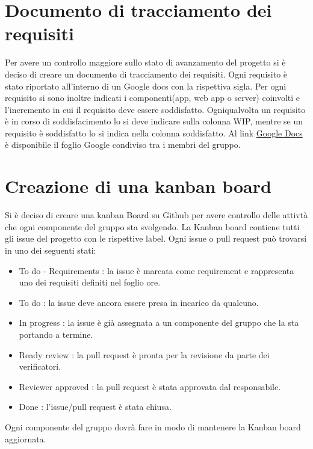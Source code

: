 \documentclass{article}
\begin{document}
\section{Documento di tracciamento dei requisiti}%
\label{sec:documento_di_tracciamento_dei_requisiti}

Per avere un controllo maggiore sullo stato di avanzamento del progetto si è deciso di creare un documento di tracciamento dei requisiti.
Ogni requisito è stato riportato all'interno di un Google docs con la rispettiva sigla. Per ogni requisito si sono inoltre indicati i componenti(app, web app o server)
coinvolti e l'incremento in cui il requisito deve essere soddisfatto.
Ogniqualvolta un requisito è in corso di soddisfacimento lo si deve indicare sulla colonna WIP, mentre se un requisito è soddisfatto lo si indica nella colonna soddisfatto.
Al link \href{https://docs.google.com/spreadsheets/d/1J-RbNrb1yN_X1rVlKzpP9rjaiGst8B62k1K6EHY-grU/edit#gid=0}{Google Docs} è disponibile il foglio Google condiviso tra i membri del gruppo.

\section{Creazione di una kanban board}%
\label{sec:creazione_di_una_kanban_board}

Si è deciso di creare una kanban Board su Github per avere controllo delle attivtà che ogni componente del gruppo sta svolgendo.
La Kanban board contiene tutti gli issue del progetto con le rispettive label. Ogni issue o pull request può trovarsi in uno dei seguenti stati:
\begin{itemize}
  \item To do - Requirements : la issue è marcata come requirement e rappresenta uno dei requisiti definiti nel foglio ore.
  \item To do : la issue deve ancora essere presa in incarico da qualcuno.
  \item In progress : la issue è già assegnata a un componente del gruppo che la sta portando a termine.
  \item Ready review : la pull request è pronta per la revisione da parte dei verificatori.
  \item Reviewer approved : la pull request è stata approvata dal responsabile.
  \item Done : l'issue/pull request è stata chiusa.
\end{itemize}
Ogni componente del gruppo dovrà fare in modo di mantenere la Kanban board aggiornata.
\end{document}
